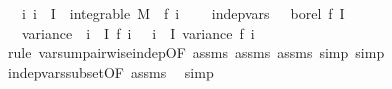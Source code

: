 \begin{isabellebody}
\ \ \ {\isachardoublequoteopen}{\isasymAnd}i{\isachardot}{\kern0pt}\ i\ {\isasymin}\ I\ {\isasymLongrightarrow}\ integrable\ M\ {\isacharparenleft}{\kern0pt}{\isasymlambda}{\isasymomega}{\isachardot}{\kern0pt}\ f\ i\ {\isasymomega}{\isacharcircum}{\kern0pt}{}{\isacharparenright}{\kern0pt}{\isachardoublequoteclose}\isanewline
\ \ \ {\isachardoublequoteopen}indep{\isacharunderscore}{\kern0pt}vars\ {\isacharparenleft}{\kern0pt}{\isasymlambda}\ {\isacharunderscore}{\kern0pt}{\isachardot}{\kern0pt}\ borel{\isacharparenright}{\kern0pt}\ f\ I{\isachardoublequoteclose}\isanewline
\ \ \ {\isachardoublequoteopen}variance\ {\isacharparenleft}{\kern0pt}{\isasymlambda}{\isasymomega}{\isachardot}{\kern0pt}\ {\isacharparenleft}{\kern0pt}{\isasymSum}i\ {\isasymin}\ I{\isachardot}{\kern0pt}\ f\ i\ {\isasymomega}{\isacharparenright}{\kern0pt}{\isacharparenright}{\kern0pt}\ {\isacharequal}{\kern0pt}\ {\isacharparenleft}{\kern0pt}{\isasymSum}i\ {\isasymin}\ I{\isachardot}{\kern0pt}\ variance\ {\isacharparenleft}{\kern0pt}f\ i{\isacharparenright}{\kern0pt}{\isacharparenright}{\kern0pt}{\isachardoublequoteclose}\isanewline
%
\isadelimproof
\ \ %
\endisadelimproof
%
\isatagproof
{}\isamarkupfalse%
\ {\isacharparenleft}{\kern0pt}rule\ var{\isacharunderscore}{\kern0pt}sum{\isacharunderscore}{\kern0pt}pairwise{\isacharunderscore}{\kern0pt}indep{\isacharunderscore}{\kern0pt}{}{\isacharbrackleft}{\kern0pt}OF\ assms{\isacharparenleft}{\kern0pt}{}{\isacharparenright}{\kern0pt}\ assms{\isacharparenleft}{\kern0pt}{}{\isacharparenright}{\kern0pt}\ assms{\isacharparenleft}{\kern0pt}{}{\isacharparenright}{\kern0pt}{\isacharbrackright}{\kern0pt}{\isacharcomma}{\kern0pt}\ simp{\isacharcomma}{\kern0pt}\ simp{\isacharparenright}{\kern0pt}\isanewline
\ \ \isamarkupfalse%
\ indep{\isacharunderscore}{\kern0pt}vars{\isacharunderscore}{\kern0pt}subset{\isacharbrackleft}{\kern0pt}OF\ assms{\isacharparenleft}{\kern0pt}{}{\isacharparenright}{\kern0pt}{\isacharbrackright}{\kern0pt}\ \isamarkupfalse%
\ simp%
\endisatagproof
{\isafoldproof}%
%
\isadelimproof
\isanewline
%
\endisadelimproof
%
\isadelimtheory
\isanewline
%
\endisadelimtheory
%
\isatagtheory
{}\isamarkupfalse%
%
\endisatagtheory
{\isafoldtheory}%
%
\isadelimtheory
%
\endisadelimtheory
%
\end{isabellebody}%
\endinput
